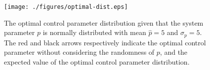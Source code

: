 \begin{figure}[tb]
    \centering
    \texttt{[image: ./figures/optimal-dist.eps]}
    \caption{The optimal control parameter distribution given that the system
    parameter $p$ is normally distributed with mean $\hat{p} = 5$ and $\sigma_p
    = 5$. The red and black arrows respectively indicate the optimal control
    parameter without considering the randomness of $p$, and the expected value
    of the optimal control parameter distribution.}
    \label{fig:optimal_dist}
\end{figure}

%


